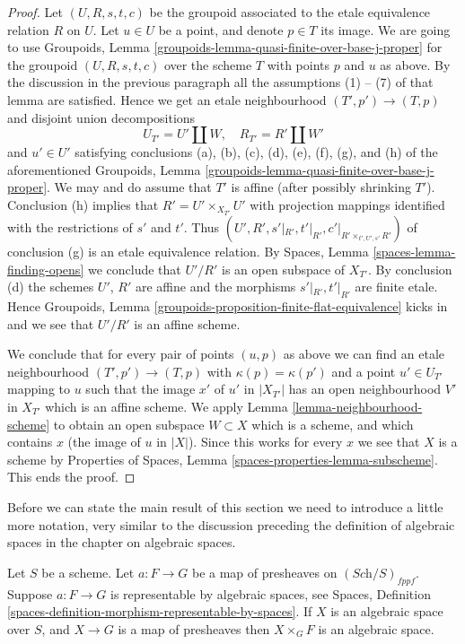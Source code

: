 \begin{proof}
\medskip\noindent
Let $(U, R, s, t, c)$ be the groupoid associated to the etale
equivalence relation $R$ on $U$. Let $u \in U$ be a point, and
denote $p \in T$ its image. We are going to use
Groupoids, Lemma \ref{groupoids-lemma-quasi-finite-over-base-j-proper}
for the groupoid $(U, R, s, t, c)$ over the scheme $T$ with
points $p$ and $u$ as above.
By the discussion in the previous paragraph all the
assumptions (1) -- (7) of that lemma are satisfied.
Hence we get an etale neighbourhood
$(T', p') \to (T, p)$ and disjoint union decompositions
$$
U_{T'} = U' \amalg W, \quad
R_{T'} = R' \amalg W'
$$
and $u' \in U'$ satisfying conclusions
(a), (b), (c), (d), (e), (f), (g), and (h) of the aforementioned
Groupoids, Lemma \ref{groupoids-lemma-quasi-finite-over-base-j-proper}.
We may and do assume that $T'$ is affine (after possibly shrinking $T'$).
Conclusion (h) implies that $R' = U' \times_{X_{T'}} U'$ with projection
mappings identified with the restrictions of $s'$ and $t'$.
Thus $(U', R', s'|_{R'}, t'|_{R'}, c'|_{R' \times_{t', U', s'} R'})$ of
conclusion (g) is an etale equivalence relation. By
Spaces, Lemma \ref{spaces-lemma-finding-opens}
we conclude that $U'/R'$ is an open subspace of $X_{T'}$. By conclusion (d)
the schemes $U'$, $R'$ are affine and the morphisms
$s'|_{R'}, t'|_{R'}$ are finite etale. Hence
Groupoids, Lemma \ref{groupoids-proposition-finite-flat-equivalence}
kicks in and we see that $U'/R'$ is an affine scheme.

\medskip\noindent
We conclude that for every pair of points $(u, p)$ as above we can
find an etale neighbourhood $(T', p') \to (T, p)$ with
$\kappa(p) = \kappa(p')$ and a point $u' \in U_{T'}$ mapping to $u$
such that the image $x'$ of $u'$ in $|X_{T'}|$ has an open neighbourhood
$V'$ in $X_{T'}$ which is an affine scheme. We apply
Lemma \ref{lemma-neighbourhood-scheme}
to obtain an open subspace $W \subset X$ which is a scheme, and
which contains $x$ (the image of $u$ in $|X|$).
Since this works for every $x$ we see that $X$
is a scheme by
Properties of Spaces, Lemma \ref{spaces-properties-lemma-subscheme}.
This ends the proof.
\end{proof}

\noindent
Before we can state the main result of this section we need to introduce
a little more notation, very similar to the discussion preceding the
definition of algebraic spaces in the chapter on algebraic spaces.

\begin{lemma}
\label{lemma-representable-by-spaces}
Let $S$ be a scheme.
Let $a : F \to G$ be a map of presheaves on $(\textit{Sch}/S)_{fppf}$.
Suppose $a : F \to G$ is representable by algebraic spaces, see
Spaces, Definition \ref{spaces-definition-morphism-representable-by-spaces}.
If $X$ is an algebraic space over $S$, and $X \to G$ is a map of presheaves
then $X \times_G F$ is an algebraic space.
\end{lemma}

